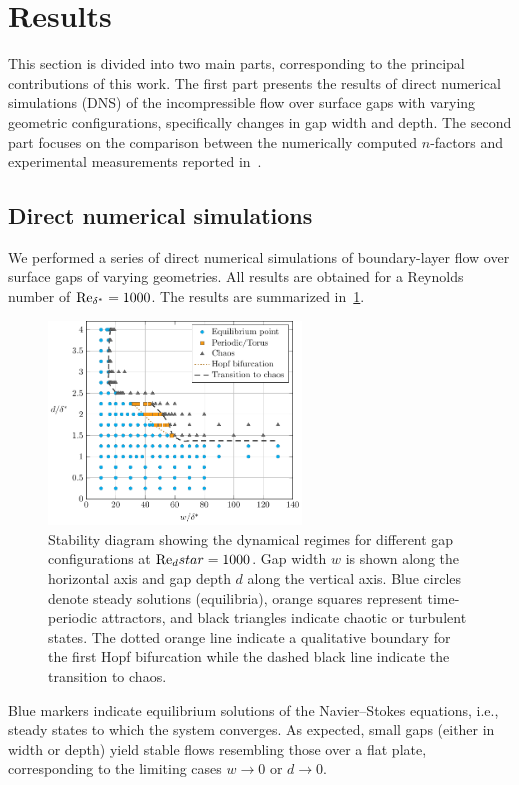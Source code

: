 \documentclass[../main.tex]{subfiles}
\begin{document}
\section{Results}\label{sec:results}

This section is divided into two main parts, corresponding to the principal contributions of this work. The first part presents the results of direct numerical simulations (DNS) of the incompressible flow over surface gaps with varying geometric configurations, specifically changes in gap width and depth. The second part focuses on the comparison between the numerically computed $n$-factors and experimental measurements reported in~\cite{jeffGaps}.

\subsection{Direct numerical simulations}\label{sec:results:dns}

We performed a series of direct numerical simulations of boundary-layer flow over surface gaps of varying geometries. All results are obtained for a Reynolds number of $\text{Re}_{\delta^*} = 1000$. The results are summarized in~\cref{fig:stability}.
\begin{figure}[H]
	\centering
	\includegraphics[width=0.6\textwidth]{../../Images/incNS2dStabilityCurve.pdf}
	\caption{Stability diagram showing the dynamical regimes for different gap configurations at $\text{Re}_dstar =1000$. Gap width $w$ is shown along the horizontal axis and gap depth $d$ along the vertical axis. Blue circles denote steady solutions (equilibria), orange squares represent time-periodic attractors, and black triangles indicate chaotic or turbulent states. The dotted orange line indicate a qualitative boundary for the first Hopf bifurcation while the dashed black line indicate the transition to chaos.}
	\label{fig:stability}
\end{figure}
Blue markers indicate equilibrium solutions of the Navier--Stokes equations, i.e., steady states to which the system converges. As expected, small gaps (either in width or depth) yield stable flows resembling those over a flat plate, corresponding to the limiting cases $w \to 0$ or $d \to 0$.
\end{document}
